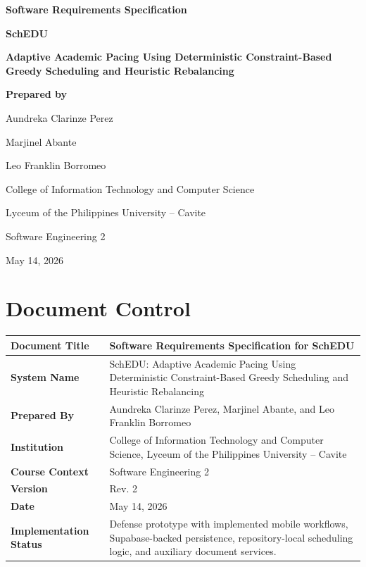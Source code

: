 \documentclass[12pt]{article}
\begin{document}
\hypersetup{pageanchor=false}
\begin{titlepage}
\centering
\vspace*{1.2cm}
{\Large\textbf{Software Requirements Specification}\par}
\vspace{1.2cm}
{\huge\textbf{SchEDU}\par}
\vspace{0.45cm}
{\large\textbf{Adaptive Academic Pacing Using Deterministic Constraint-Based Greedy Scheduling and Heuristic Rebalancing}\par}
\vfill
{\large\textbf{Prepared by}\par}
\vspace{0.35cm}
{\large Aundreka Clarinze Perez\par}
{\large Marjinel Abante\par}
{\large Leo Franklin Borromeo\par}
\vfill
{\large College of Information Technology and Computer Science\par}
{\large Lyceum of the Philippines University -- Cavite\par}
\vspace{0.35cm}
{\large Software Engineering 2\par}
\vfill
{\large May 14, 2026\par}
\end{titlepage}

\hypersetup{pageanchor=true}
\tableofcontents
\newpage

\section*{Document Control}

\begin{longtable}{|L{3.5cm}|L{10.2cm}|}
\hline
\textbf{Document Title} & Software Requirements Specification for SchEDU \\
\hline
\textbf{System Name} & SchEDU: Adaptive Academic Pacing Using Deterministic Constraint-Based Greedy Scheduling and Heuristic Rebalancing \\
\hline
\textbf{Prepared By} & Aundreka Clarinze Perez, Marjinel Abante, and Leo Franklin Borromeo \\
\hline
\textbf{Institution} & College of Information Technology and Computer Science, Lyceum of the Philippines University -- Cavite \\
\hline
\textbf{Course Context} & Software Engineering 2 \\
\hline
\textbf{Version} & Rev. 2 \\
\hline
\textbf{Date} & May 14, 2026 \\
\hline
\textbf{Implementation Status} & Defense prototype with implemented mobile workflows, Supabase-backed persistence, repository-local scheduling logic, and auxiliary document services. \\
\hline
\end{longtable}
\end{document}
